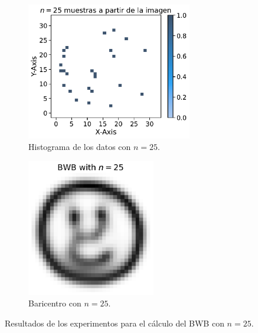 \begin{figure}[H]
    \begin{subfigure}[t]{0.49\textwidth}
        \centering
        \includegraphics[height=6cm]{img/bwb/samples-hist-n-25.pdf}
        \caption{Histograma de los datos con $n=25$.}
        \label{fig:samples-hist-n-25}
    \end{subfigure}
    \hfill
    \begin{subfigure}[t]{0.49\textwidth}
        \centering
        \includegraphics[height=6cm]{img/bwb/BWB-n-data-25.pdf}
        \caption{Baricentro con $n=25$.}
        \label{fig:bwb-n-data-25}
    \end{subfigure}
    \caption{Resultados de los experimentos para el cálculo del BWB con $n=25$.}
    \label{fig:bwb-experiments-n-25}
\end{figure}

